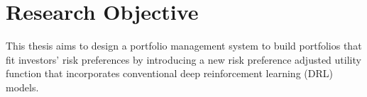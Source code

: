 \section {Research Objective}
This thesis aims to design a portfolio management system to build portfolios that fit investors' risk preferences by introducing a new risk preference adjusted utility function that incorporates conventional deep reinforcement learning (DRL) models. 
